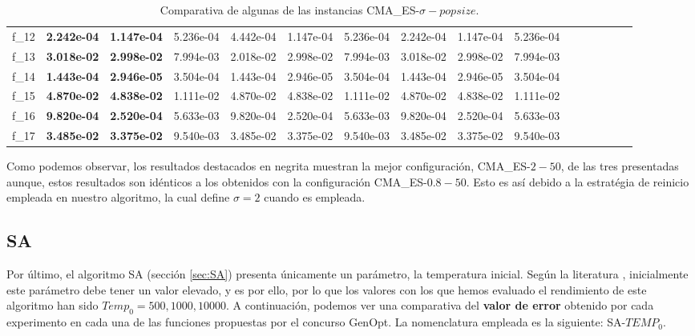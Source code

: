 \begin{table}[!ht]
{\begin{tabular}{LLLLLLLLLLLLLLLL}
f_{12} & {\bf 2.242e-04} & {\bf 1.147e-04} & 5.236e-04 & 4.442e-04 & 1.147e-04 & 5.236e-04 & 2.242e-04 & 1.147e-04 & 5.236e-04 \\
f_{13} & {\bf 3.018e-02} & {\bf 2.998e-02} & 7.994e-03 & 2.018e-02 & 2.998e-02 & 7.994e-03 & 3.018e-02 & 2.998e-02 & 7.994e-03 \\
f_{14} & {\bf 1.443e-04} & {\bf 2.946e-05} & 3.504e-04 & 1.443e-04 & 2.946e-05 & 3.504e-04 & 1.443e-04 & 2.946e-05 & 3.504e-04 \\
f_{15} & {\bf 4.870e-02} & {\bf 4.838e-02} & 1.111e-02 & 4.870e-02 & 4.838e-02 & 1.111e-02 & 4.870e-02 & 4.838e-02 & 1.111e-02 \\
f_{16} & {\bf 9.820e-04} & {\bf 2.520e-04} & 5.633e-03 & 9.820e-04 & 2.520e-04 & 5.633e-03 & 9.820e-04 & 2.520e-04 & 5.633e-03 \\
f_{17} & {\bf 3.485e-02} & {\bf 3.375e-02} & 9.540e-03 & 3.485e-02 & 3.375e-02 & 9.540e-03 & 3.485e-02 & 3.375e-02 & 9.540e-03 \\
    \bottomrule
    \end{tabular}}
    \captionsetup{justification=centering}
    \caption{Comparativa de algunas de las instancias CMA\_ES-$\sigma-popsize$.}    
\end{table}

Como podemos observar, los resultados destacados en negrita muestran la mejor configuración, CMA\_ES-$2-50$, de las tres presentadas aunque, estos resultados son idénticos a los obtenidos con la configuración CMA\_ES-$0.8-50$. Esto es así debido a la estratégia de reinicio empleada en nuestro algoritmo, la cual define $\sigma = 2$ cuando es empleada.

\newpage

\subsection{SA}\label{sec:paramSA}

Por último, el algoritmo SA (sección \ref{sec:SA}) presenta únicamente un parámetro, la temperatura inicial. Según la literatura \cite{metabook}, inicialmente este parámetro debe tener un valor elevado, y es por ello, por lo que los valores con los que hemos evaluado el rendimiento de este algoritmo han sido $Temp_{0} = 500, 1000, 10000$. A continuación, podemos ver una comparativa del \textbf{valor de error} obtenido por cada experimento en cada una de las funciones propuestas por el concurso GenOpt. La nomenclatura empleada es la siguiente: SA-$TEMP_{0}$.

